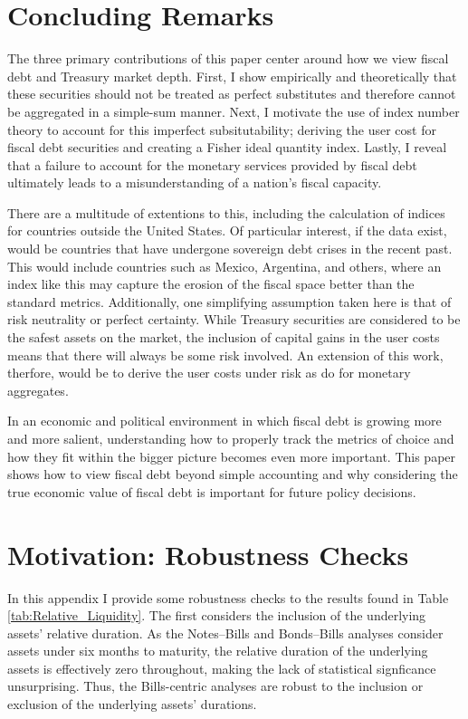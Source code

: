 \documentclass[11pt,a4paper,margin=1.5in]{article}
\begin{document}
\section{Concluding Remarks}
\label{sec:Conclusion}
The three primary contributions of this paper center around how we view fiscal debt and Treasury market depth.
First, I show empirically and theoretically that these securities should not be treated as perfect substitutes and therefore cannot be aggregated in a simple-sum manner. 
Next, I motivate the use of index number theory to account for this imperfect subsitutability; deriving the user cost for fiscal debt securities and creating a Fisher ideal quantity index.
Lastly, I reveal that a failure to account for the monetary services provided by fiscal debt ultimately leads to a misunderstanding of a nation's fiscal capacity. 

There are a multitude of extentions to this, including the calculation of indices for countries outside the United States.
Of particular interest, if the data exist, would be countries that have undergone sovereign debt crises in the recent past.
This would include countries such as Mexico, Argentina, and others, where an index like this may capture the erosion of the fiscal space better than the standard metrics.
Additionally, one simplifying assumption taken here is that of risk neutrality or perfect certainty.
While Treasury securities are considered to be the safest assets on the market, the inclusion of capital gains in the user costs means that there will always be some risk involved.
An extension of this work, therfore, would be to derive the user costs under risk as \citet{Barnett-Liu-Jensen:1997} do for monetary aggregates.

In an economic and political environment in which fiscal debt is growing more and more salient, understanding how to properly track the metrics of choice and how they fit within the bigger picture becomes even more important.
This paper shows how to view fiscal debt beyond simple accounting and why considering the true economic value of fiscal debt is important for future policy decisions. 
\newpage




\newpage
\appendix
{}
\section{Motivation: Robustness Checks} 
\label{app:Robust_Duration}
In this appendix I provide some robustness checks to the results found in Table \ref{tab:Relative_Liquidity}.
The first considers the inclusion of the underlying assets' relative duration.
As the Notes--Bills and Bonds--Bills analyses consider assets under six months to maturity, the relative duration of the underlying assets is effectively zero throughout, making the lack of statistical signficance unsurprising.
Thus, the Bills-centric analyses are robust to the inclusion or exclusion of the underlying assets' durations.
\end{document}
